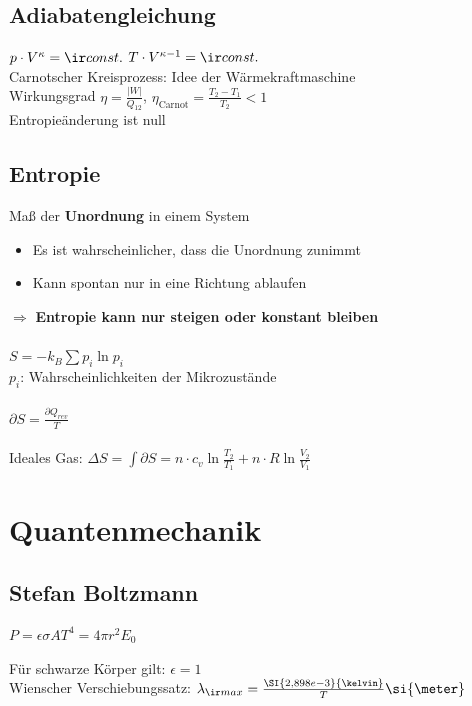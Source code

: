 \documentclass[german]{latex4ei/latex4ei_sheet}
\begin{document}
\begin{sectionbox}
\subsection{Adiabatengleichung}
$p\cdot V^\kappa = \ir const.$ \qquad $T\cdot V^{\kappa -1} = \ir const.$ \\
Carnotscher Kreisprozess: Idee der Wärmekraftmaschine\\
Wirkungsgrad $\eta = \frac{\vert W\vert}{Q_{12}}$, $\eta_{\text{Carnot}} = \frac{T_2-T_1}{T_2} < 1$\\
Entropieänderung ist null
\end{sectionbox}

\begin{sectionbox}
\subsection{Entropie}
Maß der \textbf{Unordnung} in einem System
\begin{itemize}
	\item Es ist wahrscheinlicher, dass die Unordnung zunimmt
	\item Kann spontan nur in eine Richtung ablaufen
\end{itemize}
$\Rightarrow$ \textbf{Entropie kann nur steigen oder konstant bleiben}\\ \\
$S=-k_B\sum p_i \ln p_i$ \\ 
$p_i$: Wahrscheinlichkeiten der Mikrozustände\\ \\
$\partial S = \frac{\partial Q_{rev}}{T}$\\ \\
Ideales Gas: $\Delta S= \int \partial S = n \cdot c_v \ln \frac{T_2}{T_1}+n\cdot R \ln \frac{V_2}{V_1}$
\end{sectionbox}



\section{Quantenmechanik}
\begin{sectionbox}
\subsection{Stefan Boltzmann}
\begin{emphbox}
$P=\epsilon \sigma A T^4 = 4 \pi r^2 E_0$
\end{emphbox}
Für schwarze Körper gilt: $\epsilon = 1$\\
Wienscher Verschiebungssatz: $\lambda_{\ir max}=\frac{\SI{2,898e-3}{\kelvin}}{T} \si{\meter}$
\end{sectionbox}
\end{document}
